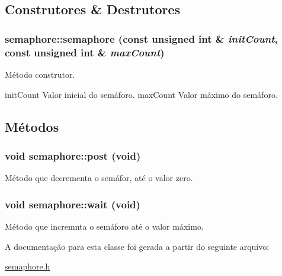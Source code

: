 \subsection{Construtores \& Destrutores}
\hypertarget{classsemaphore_a77d85322407545b8ccc4a85b920d90c1}{
\subsubsection[{semaphore}]{\setlength{\rightskip}{0pt plus 5cm}semaphore::semaphore (const unsigned int \& {\em initCount}, \/  const unsigned int \& {\em maxCount})}}
\label{classsemaphore_a77d85322407545b8ccc4a85b920d90c1}
Método construtor.

initCount Valor inicial do semáforo.  maxCount Valor máximo do semáforo. 

\subsection{Métodos}
\hypertarget{classsemaphore_a14c3b9f4312c43d9400905c938752665}{
\subsubsection[{post}]{\setlength{\rightskip}{0pt plus 5cm}void semaphore::post (void)}}
\label{classsemaphore_a14c3b9f4312c43d9400905c938752665}
Método que decrementa o semáfor, até o valor zero. \hypertarget{classsemaphore_af0e430d192c44be1d65f5a4fd8cb91a4}{
\subsubsection[{wait}]{\setlength{\rightskip}{0pt plus 5cm}void semaphore::wait (void)}}
\label{classsemaphore_af0e430d192c44be1d65f5a4fd8cb91a4}
Método que incremnta o semáforo até o valor máximo. 

A documentação para esta classe foi gerada a partir do seguinte arquivo:\begin{DoxyCompactItemize}
\item 
\hyperlink{semaphore_8h}{semaphore.h}\end{DoxyCompactItemize}
